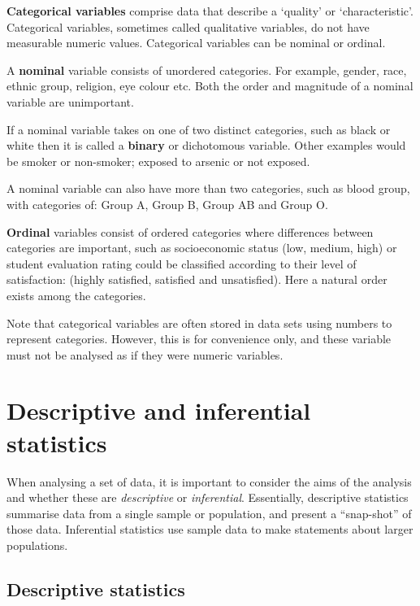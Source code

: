 \documentclass[
  a4paper,
]{memoir}
\begin{document}
\textbf{Categorical variables} comprise data that describe a `quality'
or `characteristic'. Categorical variables, sometimes called qualitative
variables, do not have measurable numeric values. Categorical variables
can be nominal or ordinal.

A \textbf{nominal} variable consists of unordered categories. For
example, gender, race, ethnic group, religion, eye colour etc. Both the
order and magnitude of a nominal variable are unimportant.

If a nominal variable takes on one of two distinct categories, such as
black or white then it is called a \textbf{binary} or dichotomous
variable. Other examples would be smoker or non-smoker; exposed to
arsenic or not exposed.

A nominal variable can also have more than two categories, such as blood
group, with categories of: Group A, Group B, Group AB and Group O.

\textbf{Ordinal} variables consist of ordered categories where
differences between categories are important, such as socioeconomic
status (low, medium, high) or student evaluation rating could be
classified according to their level of satisfaction: (highly satisfied,
satisfied and unsatisfied). Here a natural order exists among the
categories.

Note that categorical variables are often stored in data sets using
numbers to represent categories. However, this is for convenience only,
and these variable must not be analysed as if they were numeric
variables.

\hypertarget{descriptive-and-inferential-statistics}{%
\section{Descriptive and inferential
statistics}\label{descriptive-and-inferential-statistics}}

When analysing a set of data, it is important to consider the aims of
the analysis and whether these are \emph{descriptive} or
\emph{inferential}. Essentially, descriptive statistics summarise data
from a single sample or population, and present a ``snap-shot'' of those
data. Inferential statistics use sample data to make statements about
larger populations.

\hypertarget{descriptive-statistics}{%
\subsection{Descriptive statistics}\label{descriptive-statistics}}
\end{document}
